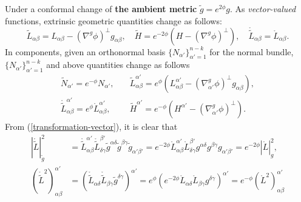 \documentclass[11pt,letterpaper]{amsart}
\newcommand{\cg}{\widetilde{g}}
\newcommand{\cH}{\widetilde{H}}
\newcommand{\cL}{\widetilde{L}}
\newcommand{\cN}{\widetilde{N}}
\theoremstyle{definition}
\theoremstyle{remark}
\numberwithin{equation}{section}
\begin{document}
Under a conformal change of \textbf{the ambient metric} $\tilde{g}=e^{2\phi}g$. As \textit{vector-valued} functions, extrinsic geometric quantities change as follows:
\begin{equation}\label{transformation-vector}
    \cL_{\alpha\beta}=L_{\alpha\beta}-\left(\nabla^g \phi\right)^{\perp}g_{\alpha\beta}, \quad \cH=e^{-2\phi}(H-\left(\nabla^g \phi\right)^{\perp}), \quad \mathring{\cL}_{\alpha\beta}=\mathring{L}_{\alpha\beta}.
\end{equation}
In components, given an orthonormal basis $\{N_{\alpha'}\}_{\alpha'=1}^{n-k}$ for the normal bundle, $\{N_{\alpha'}\}_{\alpha'=1}^{n-k}$ and above quantities change as follows
\begin{equation}\label{transformation-component}
\begin{split}
    \cN_{\alpha'}=e^{-\phi}N_{\alpha'}, &\quad \cL^{\alpha'}_{\alpha\beta}=e^{\phi}\left(L^{\alpha'}_{\alpha\beta}-\left(\nabla^g_{\alpha'} \phi\right)^{\perp}g_{\alpha\beta}\right),\\  \mathring{\cL}^{\alpha'}_{\alpha\beta}=e^{\phi}\mathring{L}^{\alpha'}_{\alpha\beta}, &\quad \cH^{\alpha'}=e^{-\phi}(H^{\alpha'}-\left(\nabla_{\alpha'}^g \phi\right)^{\perp}).
    \end{split}
\end{equation}
From (\ref{transformation-vector}), it is clear that
\begin{equation*}
\begin{split}
|\mathring{\cL}|_{\cg}^2&=\mathring{\cL}^{\alpha'}_{\alpha\beta}\mathring{\cL}^{\beta'}_{\delta\gamma}\cg^{\alpha\delta}\cg^{\beta\gamma}\cg_{\alpha' \beta'}=e^{-2\phi}\mathring{L}^{\alpha'}_{\alpha\beta}\mathring{L}^{\beta'}_{\delta\gamma}g^{\alpha\delta}g^{\beta\gamma}g_{\alpha' \beta'}=e^{-2\phi}|\mathring{L}|_{g}^2,\\
\left(\mathring{\cL}^2\right)_{\alpha\beta}^{\alpha'}&=\left(\mathring{\cL}_{\alpha\delta}\mathring{\cL}_{\beta\gamma}\cg^{\delta\gamma}\right)^{\alpha'}=e^{\phi}\left(e^{-2\phi}\mathring{L}_{\alpha\delta}\mathring{L}_{\beta\gamma}g^{\delta\gamma}\right)^{\alpha'}=e^{-\phi}\left(\mathring{L}^2\right)_{\alpha\beta}^{\alpha'}
\end{split}
\end{equation*}
\end{document}
